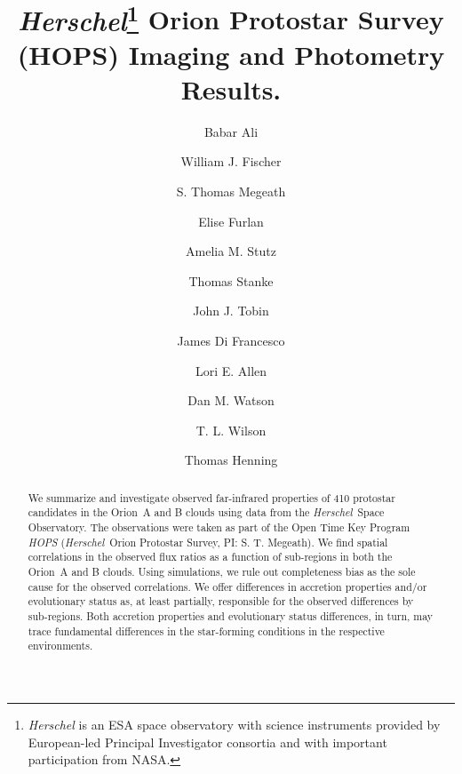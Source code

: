\documentclass[manuscript]{aastex61}
\newcommand{\herschel}{{\em Herschel}}
\begin{document}
\title{\herschel\footnote{{\it Herschel} is an ESA space observatory with science instruments provided by European-led Principal Investigator consortia and with important participation from NASA.} Orion Protostar Survey (HOPS) Imaging and Photometry Results.}


\author{Babar Ali}

\author{William J. Fischer}

\author{S. Thomas Megeath}

\author{Elise Furlan}

\author{Amelia M. Stutz}

\author{Thomas Stanke}

\author{John J. Tobin}

\author{James Di Francesco}

\author{Lori E. Allen}

\author{Dan M. Watson}

\author{T. L. Wilson}

\author{Thomas Henning}

\begin{abstract}
We summarize and investigate observed far-infrared properties of 410 protostar candidates in the Orion~A and B clouds using data from the \herschel\ Space Observatory.  The observations were taken as part of the Open Time Key Program {\it HOPS} (\herschel\ Orion Protostar Survey, PI: S. T. Megeath).  We find spatial correlations in the observed flux ratios as a function of sub-regions in both the Orion~A and B clouds.  Using simulations, we rule out completeness bias as the sole cause for the observed correlations.  We offer differences in accretion properties and/or evolutionary status as, at least partially, responsible for the observed differences by sub-regions.  Both accretion properties and evolutionary status differences, in turn, may trace fundamental differences in the star-forming conditions in the respective environments.  \end{abstract}
\end{document}
